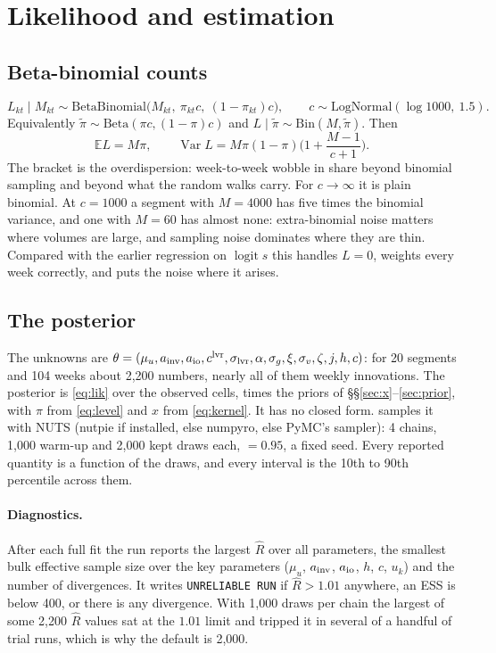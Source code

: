 \documentclass[11pt,a4paper]{article}
\theoremstyle{remark}
\newcommand{\code}[1]{\texttt{\detokenize{#1}}}
\newcommand{\E}{\mathbb{E}}
\newcommand{\Var}{\operatorname{Var}}
\newcommand{\logit}{\operatorname{logit}}
\begin{document}
\section{Likelihood and estimation}\label{sec:fit}

\subsection{Beta-binomial counts}
\begin{equation}\label{eq:lik}
L_{kt}\mid M_{kt}\sim\mathrm{BetaBinomial}\big(M_{kt},\ \pi_{kt}c,\ (1-\pi_{kt})c\big),\qquad
c\sim\mathrm{LogNormal}(\log1000,\ 1.5).
\end{equation}
Equivalently $\tilde\pi\sim\mathrm{Beta}(\pi c,(1-\pi)c)$ and $L\mid\tilde\pi\sim\mathrm{Bin}(M,\tilde\pi)$. Then
\[
\E L=M\pi,\qquad \Var L=M\pi(1-\pi)\Big(1+\frac{M-1}{c+1}\Big).
\]
The bracket is the overdispersion: week-to-week wobble in share beyond binomial sampling and beyond
what the random walks carry. For $c\to\infty$ it is plain binomial. At $c=1000$ a segment with
$M=4000$ has five times the binomial variance, and one with $M=60$ has almost none: extra-binomial
noise matters where volumes are large, and sampling noise dominates where they are thin. Compared
with the earlier regression on $\logit s$ this handles $L=0$, weights every week correctly, and
puts the noise where it arises.

\subsection{The posterior}
The unknowns are $\theta=(\mu_u,a_{\rm inv},a_{\rm io},c^{\rm lvr},\sigma_{\rm lvr},\alpha,\sigma_g,\xi,\sigma_v,\zeta,j,h,c)$:
for 20 segments and 104 weeks about 2{,}200 numbers, nearly all of them weekly innovations. The
posterior is \eqref{eq:lik} over the observed cells, times the priors of
\S\S\ref{sec:x}--\ref{sec:prior}, with $\pi$ from \eqref{eq:level} and $x$ from \eqref{eq:kernel}.
It has no closed form. \code{bayes.fit} samples it with NUTS (nutpie if installed, else numpyro, else PyMC's
sampler): 4 chains, 1{,}000 warm-up and 2{,}000 kept draws each, \code{target_accept} $=0.95$, a fixed seed. Every
reported quantity is a function of the draws, and every interval is the 10th to 90th percentile
across them.

\paragraph{Diagnostics.} After each full fit the run reports the largest $\hat R$ over all
parameters, the smallest bulk effective sample size over the key parameters
($\mu_u$, $a_{\rm inv}$, $a_{\rm io}$, $h$, $c$, $u_k$) and the number of divergences. It writes
\texttt{UNRELIABLE RUN} if $\hat R>1.01$ anywhere, an ESS is below 400, or there is any divergence.
With 1{,}000 draws per chain the largest of some 2{,}200 $\hat R$ values sat at the $1.01$ limit and
tripped it in several of a handful of trial runs, which is why the default is 2{,}000.
\end{document}
